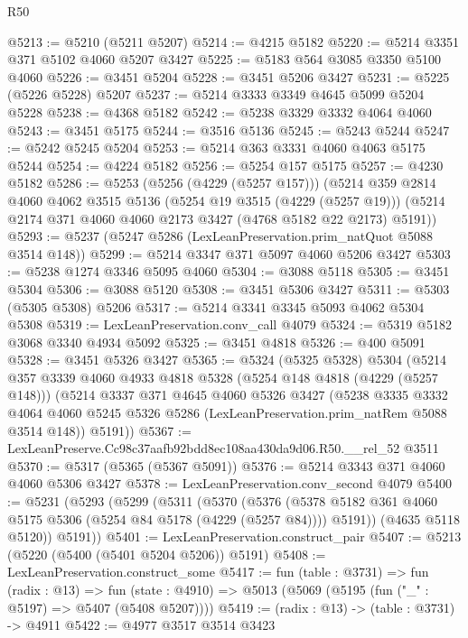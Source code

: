\begin{lexlean}{R50}
\begin{coremodule}
@5213 := @5210 (@5211 @5207)
@5214 := @4215 @5182
@5220 := @5214 @3351 @371 @5102 @4060 @5207 @3427
@5225 := @5183 @564 @3085 @3350 @5100 @4060
@5226 := @3451 @5204
@5228 := @3451 @5206 @3427
@5231 := @5225 (@5226 @5228) @5207
@5237 := @5214 @3333 @3349 @4645 @5099 @5204 @5228
@5238 := @4368 @5182
@5242 := @5238 @3329 @3332 @4064 @4060
@5243 := @3451 @5175
@5244 := @3516 @5136
@5245 := @5243 @5244
@5247 := @5242 @5245 @5204
@5253 := @5214 @363 @3331 @4060 @4063 @5175 @5244
@5254 := @4224 @5182
@5256 := @5254 @157 @5175
@5257 := @4230 @5182
@5286 := @5253
    (@5256 (@4229 (@5257 @157)))
    (@5214
      @359
      @2814
      @4060
      @4062
      @3515
      @5136
      (@5254 @19 @3515 (@4229 (@5257 @19)))
      (@5214 @2174 @371 @4060 @4060 @2173 @3427 (@4768 @5182 @22 @2173) @5191))
@5293 := @5237 (@5247 @5286 (LexLeanPreservation.prim_natQuot @5088 @3514 @148))
@5299 := @5214 @3347 @371 @5097 @4060 @5206 @3427
@5303 := @5238 @1274 @3346 @5095 @4060
@5304 := @3088 @5118
@5305 := @3451 @5304
@5306 := @3088 @5120
@5308 := @3451 @5306 @3427
@5311 := @5303 (@5305 @5308) @5206
@5317 := @5214 @3341 @3345 @5093 @4062 @5304 @5308
@5319 := LexLeanPreservation.conv_call @4079
@5324 := @5319 @5182 @3068 @3340 @4934 @5092
@5325 := @3451 @4818
@5326 := @400 @5091
@5328 := @3451 @5326 @3427
@5365 := @5324
    (@5325 @5328)
    @5304
    (@5214
      @357
      @3339
      @4060
      @4933
      @4818
      @5328
      (@5254 @148 @4818 (@4229 (@5257 @148)))
      (@5214
        @3337
        @371
        @4645
        @4060
        @5326
        @3427
        (@5238
          @3335
          @3332
          @4064
          @4060
          @5245
          @5326
          @5286
          (LexLeanPreservation.prim_natRem @5088 @3514 @148))
        @5191))
@5367 := LexLeanPreserve.Cc98c37aafb92bdd8ec108aa430da9d06.R50.__rel_52 @3511
@5370 := @5317 (@5365 (@5367 @5091))
@5376 := @5214 @3343 @371 @4060 @4060 @5306 @3427
@5378 := LexLeanPreservation.conv_second @4079
@5400 := @5231
    (@5293
      (@5299
        (@5311
          (@5370
            (@5376
              (@5378 @5182 @361 @4060 @5175 @5306 (@5254 @84 @5178 (@4229 (@5257 @84))))
              @5191))
          (@4635 @5118 @5120))
        @5191))
@5401 := LexLeanPreservation.construct_pair
@5407 := @5213 (@5220 (@5400 (@5401 @5204 @5206)) @5191)
@5408 := LexLeanPreservation.construct_some
@5417 := fun (table : @3731) =>
  fun (radix : @13) =>
  fun (state : @4910) => @5013 (@5069 (@5195 (fun ("_" : @5197) => @5407 (@5408 @5207))))
@5419 := (radix : @13) -> (table : @3731) -> @4911
@5422 := @4977 @3517 @3514 @3423

\end{coremodule}
\end{lexlean}
